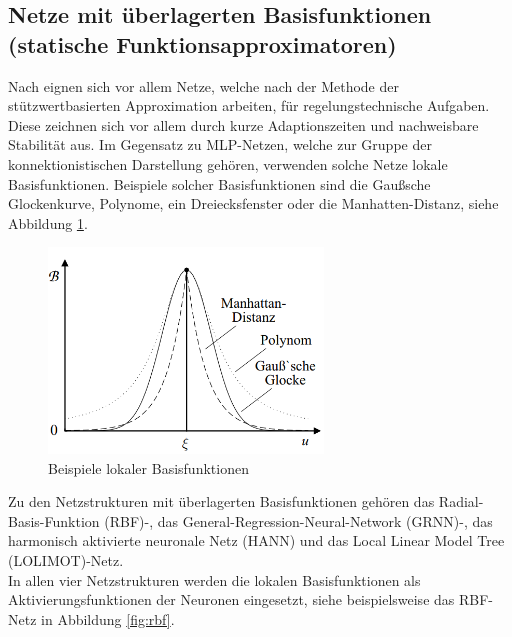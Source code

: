 \subsection{Netze mit überlagerten Basisfunktionen (statische Funktionsapproximatoren)}

Nach \cite{Schroder.2010} eignen sich vor allem Netze, welche nach der Methode der stützwertbasierten Approximation arbeiten, für regelungstechnische Aufgaben. Diese zeichnen sich vor allem durch kurze Adaptionszeiten und nachweisbare Stabilität aus. Im Gegensatz zu MLP-Netzen, welche zur Gruppe der konnektionistischen Darstellung gehören, verwenden solche Netze lokale Basisfunktionen. Beispiele solcher Basisfunktionen sind die Gaußsche Glockenkurve, Polynome, ein Dreiecksfenster oder die Manhatten-Distanz, siehe Abbildung \ref{fig:basisfunktionen}.

\begin{figure} [H]
	\centering
	\includegraphics[width=0.65\textwidth]{images/basisfunktionen}
	\caption{Beispiele lokaler Basisfunktionen \cite{Schroder.2010}}
	\label{fig:basisfunktionen}
\end{figure}


Zu den Netzstrukturen mit überlagerten Basisfunktionen gehören das Radial-Basis-Funktion (RBF)-, das General-Regression-Neural-Network (GRNN)-, das harmonisch aktivierte neuronale Netz (HANN) und das Local Linear Model Tree (LOLIMOT)-Netz. \\

In allen vier Netzstrukturen werden die lokalen Basisfunktionen als Aktivierungsfunktionen der Neuronen eingesetzt, siehe beispielsweise das RBF-Netz in Abbildung \ref{fig:rbf}.

